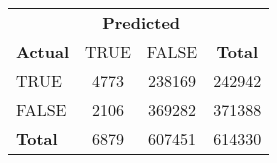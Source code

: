 
\begin{tabular}{l|c|c|c}
\hline
           & \multicolumn{2}{c|}{\textbf{Predicted}} & \\
\cline{2-3}
\textbf{Actual} & TRUE & FALSE & \textbf{Total} \\
\hline
TRUE   & 4773 & 238169 & 242942 \\
FALSE  & 2106 & 369282 & 371388 \\
\hline
\textbf{Total} & 6879 & 607451 & 614330 \\
\hline
\end{tabular}
